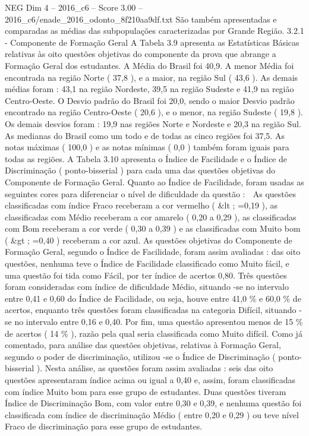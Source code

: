 \begin{textsample}{NEG Dim 4 – 2016\_c6 – Score 3.00 – 2016\_c6/enade\_2016\_odonto\_8f210aa9df.txt}
São também apresentadas e comparadas as médias das subpopulações caracterizadas por Grande Região. 3.2.1 - Componente de Formação Geral A Tabela 3.9 apresenta as Estatísticas Básicas relativas às oito questões objetivas do componente da prova que abrange a Formação Geral dos estudantes.
A Média do Brasil foi 40,9.
A menor Média foi encontrada na região Norte ( 37,8 ), e a maior, na região Sul ( 43,6 ).
As demais médias foram : 43,1 na região Nordeste, 39,5 na região Sudeste e 41,9 na região Centro-Oeste.
O Desvio padrão do Brasil foi 20,0, sendo o maior Desvio padrão encontrado na região Centro-Oeste ( 20,6 ), e o menor, na região Sudeste ( 19,8 ).
Os demais desvios foram : 19,9 nas regiões Norte e Nordeste e 20,3 na região Sul.
As medianas do Brasil como um todo e de todas as cinco regiões foi 37,5.
As notas máximas ( 100,0 ) e as notas mínimas ( 0,0 ) também foram iguais para todas as regiões.
A Tabela 3.10 apresenta o Índice de Facilidade e o Índice de Discriminação ( ponto-bisserial ) para cada uma das questões objetivas do Componente de Formação Geral.
Quanto ao Índice de Facilidade, foram usadas as seguintes cores para diferenciar o nível de dificuldade da questão :  As questões classificadas com índice Fraco receberam a cor vermelho ( \&lt ; =0,19 ), as classificadas com Médio receberam a cor amarelo ( 0,20 a 0,29 ), as classificadas com Bom receberam a cor verde ( 0,30 a 0,39 ) e as classificadas com Muito bom ( \&gt ; =0,40 ) receberam a cor azul.
As questões objetivas do Componente de Formação Geral, segundo o Índice de Facilidade, foram assim avaliadas : das oito questões, nenhuma teve o Índice de Facilidade classificado como Muito fácil, e uma questão foi tida como Fácil, por ter índice de acertos 0,80.
Três questões foram consideradas com índice de dificuldade Médio, situando -se no intervalo entre 0,41 e 0,60 do Índice de Facilidade, ou seja, houve entre 41,0 \% e 60,0 \% de acertos, enquanto três questões foram classificadas na categoria Difícil, situando -se no intervalo entre 0,16 e 0,40.
Por fim, uma questão apresentou menos de 15 \% de acertos ( 14 \% ), razão pela qual seria classificada como Muito difícil.
Como já comentado, para análise das questões objetivas, relativas à Formação Geral, segundo o poder de discriminação, utilizou -se o Índice de Discriminação ( ponto-bisserial ).
Nesta análise, as questões foram assim avaliadas : seis das oito questões apresentaram índice acima ou igual a 0,40 e, assim, foram classificadas com índice Muito bom para esse grupo de estudantes.
Duas questões tiveram Índice de Discriminação Bom, com valor entre 0,30 e 0,39, e nenhuma questão foi classificada com índice de discriminação Médio ( entre 0,20 e 0,29 ) ou teve nível Fraco de discriminação para esse grupo de estudantes.

\end{textsample}
